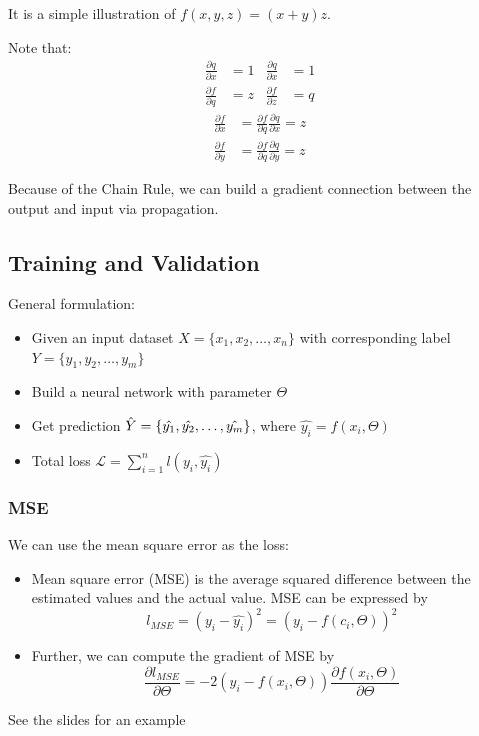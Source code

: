 \documentclass[letterpaper,12pt]{article}
\begin{document}
It is a simple illustration of $f(x,y,z)=(x+y)z$.

Note that:
\begin{align*}
    \frac{\partial q}{\partial x} & = 1 & \frac{\partial q}{\partial x} & = 1\\
    \frac{\partial f}{\partial q} & = z & \frac{\partial f}{\partial z} & = q
\end{align*}
\begin{align*}
    \frac{\partial f}{\partial x}& = \frac{\partial f}{\partial q} \frac{\partial q}{\partial x} = z\\
    \frac{\partial f}{\partial y}& = \frac{\partial f}{\partial q} \frac{\partial q}{\partial y} = z
\end{align*}

Because of the Chain Rule, we can build a gradient connection between the output and input via propagation. 

\subsection{Training and Validation}

General formulation:\begin{itemize}
    \item Given an input dataset $X=\{x_1,x_2,\ldots,x_n\}$ with corresponding label $Y=\{y_1,y_2,\ldots,y_m\}$
    \item Build a neural network with parameter $\Theta$
    \item Get prediction $\Hat{Y}=\{\hat{y_1},\hat{y_2},\ldots,\hat{y_m}\}$, where $\hat{y_i}=f(x_i,\Theta)$
    \item Total loss $\mathcal{L}=\sum_{i=1}^{n}l(y_i,\hat{y_i})$
\end{itemize}
\subsubsection{MSE}
We can use the mean square error as the loss:\begin{itemize}
    \item Mean square error (MSE) is the average squared difference between the estimated values and the actual value. MSE can be expressed by\[l_{MSE}=(y_i-\hat{y_i})^2=(y_i-f(c_i,\Theta))^2\]
    \item Further, we can compute the gradient of MSE by\[\frac{\partial l_{MSE}}{\partial \Theta}=-2(y_i-f(x_i,\Theta))\frac{\partial f(x_i,\Theta)}{\partial \Theta}\]
\end{itemize}
See the slides for an example
\end{document}
